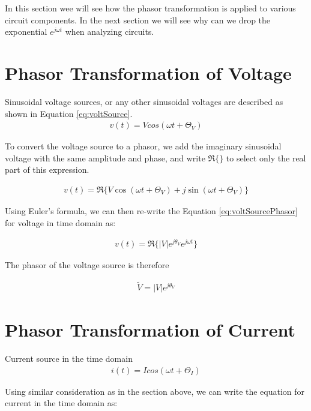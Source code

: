 \documentclass{ximera}
\begin{document}
In this section wee will see how the phasor transformation is applied to various circuit components. In the next section we will see why can we drop the exponential $e^{j\omega t}$ when analyzing circuits.


\section{Phasor Transformation of Voltage}


Sinusoidal voltage sources, or any other sinusoidal voltages are described as shown in Equation \ref{eq:voltSource}.
\begin{eqnarray}
v(t)= V cos (\omega t + \Theta_{V} ) \label{eq:voltSource}
\end{eqnarray}

To convert the voltage source to a phasor, we add the imaginary sinusoidal voltage with the same amplitude and phase, and write $\Re\{\}$ to select  only the real part of this expression.


\begin{eqnarray}
v(t)= \Re \{V \cos (\omega t + \Theta_{V} )+ j \sin (\omega t + \Theta_{V} ) \} \label{eq:voltSourcePhasor}
\end{eqnarray}

Using Euler's formula, we can then re-write the Equation \ref{eq:voltSourcePhasor} for voltage in time domain as:


\begin{eqnarray}
v(t)=\Re\{|V|e^{j\theta_{V}} e^{j \omega t}\}\label{eq:VoltageDef}
\end{eqnarray}

The phasor of the voltage source is therefore

\begin{eqnarray}
\tilde{V}=|V|e^{j\theta_{V}} 
\end{eqnarray}



\section{Phasor Transformation of  Current}

Current source in the time domain 
\begin{eqnarray}
i(t)= I cos (\omega t + \Theta_{I} ) 
\end{eqnarray}


Using similar consideration as in the section above, we can write the equation for current in the time domain as: 
\end{document}
